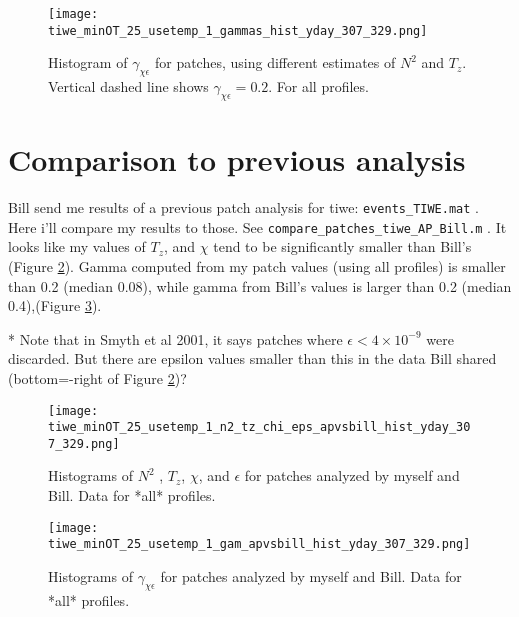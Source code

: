 \documentclass[11pt]{article}
\begin{document}
\begin{figure}[htbp]
\texttt{[image: tiwe\_minOT\_25\_usetemp\_1\_gammas\_hist\_yday\_307\_329.png]}
\caption{Histogram of $\gamma_{\chi\epsilon}$ for patches, using different estimates of $N^2$ and $T_z$. Vertical dashed line shows $\gamma_{\chi\epsilon}=0.2$. For all profiles.}
\label{patchgam}
\end{figure}
%
%




\clearpage
\section{Comparison to previous analysis}

Bill send me results of a previous patch analysis for tiwe: \verb+events_TIWE.mat+ . Here i'll compare my results to those. See \verb+compare_patches_tiwe_AP_Bill.m+ . It looks like my values of $T_z$, and $\chi$ tend to be significantly smaller than Bill's (Figure \ref{comp_bill_ap_1}). Gamma computed from my patch values (using all profiles) is smaller than 0.2 (median 0.08), while gamma from Bill's values is larger than 0.2 (median 0.4),(Figure \ref{comp_bill_ap_gam}).

* Note that in Smyth et al 2001, it says patches where $\epsilon < 4 \times 10^{-9}$ were discarded. But there are epsilon values smaller than this in the data Bill shared (bottom=-right of Figure \ref{comp_bill_ap_1})?

\begin{figure}[htbp]
\texttt{[image: tiwe\_minOT\_25\_usetemp\_1\_n2\_tz\_chi\_eps\_apvsbill\_hist\_yday\_307\_329.png]}
\caption{Histograms of $N^2$ , $T_z$, $\chi$, and $\epsilon$ for patches analyzed by myself and Bill. Data for *all* profiles.}
\label{comp_bill_ap_1}
\end{figure}
%

\begin{figure}[htbp]
\texttt{[image: tiwe\_minOT\_25\_usetemp\_1\_gam\_apvsbill\_hist\_yday\_307\_329.png]}
\caption{Histograms of $\gamma_{\chi\epsilon}$ for patches analyzed by myself and Bill. Data for *all* profiles.}
\label{comp_bill_ap_gam}
\end{figure}
\end{document}
